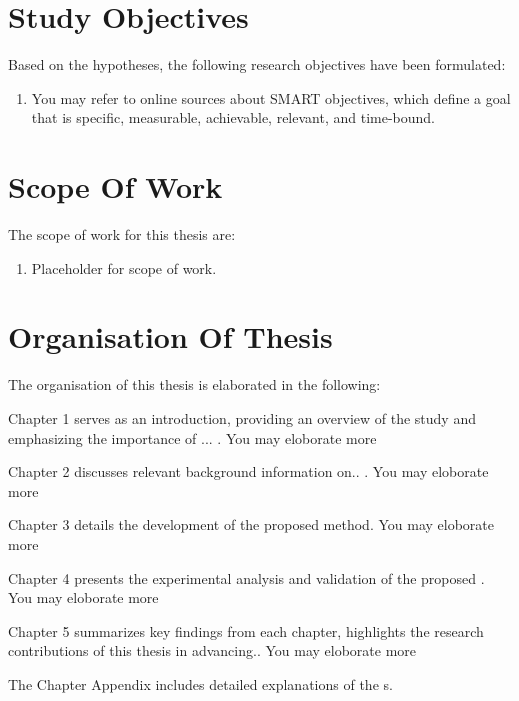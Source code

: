 \section{Study Objectives}



Based on the hypotheses, the following research objectives have been formulated:

\begin{enumerate}    
    \item  You may refer to online sources about SMART objectives, which define a goal that is specific, measurable, achievable, relevant, and time-bound.


       


    
\end{enumerate}



\section{Scope Of Work}

The scope of work for this thesis are:

\begin{enumerate}    
    \item Placeholder for scope of work.
\end{enumerate}

\section{Organisation Of Thesis}
\label{ThesisOrganisation}


\noindent The organisation of this thesis is elaborated in the following:

Chapter 1 serves as an introduction, providing an overview of the study and emphasizing the importance of ... . You may eloborate more

Chapter 2 discusses relevant background information on.. . You may eloborate more

Chapter 3 details the development of the proposed method. You may eloborate more

Chapter 4 presents the experimental analysis and validation of the proposed . You may eloborate more

Chapter 5 summarizes key findings from each chapter, highlights the research contributions of this thesis in advancing.. You may eloborate more


The Chapter Appendix includes detailed explanations of the s.